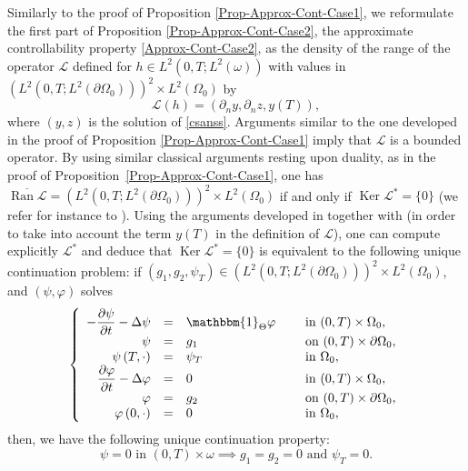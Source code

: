 \documentclass[JEP,XML,SOM,Unicode,NoFloatCountersInSection]{cedram}
\DeclareMathOperator{\Ker}{Ker}
\DeclareMathOperator{\Ran}{Ran}
\theoremstyle{definition}
\begin{document}
Similarly to the proof of Proposition \ref{Prop-Approx-Cont-Case1}, we reformulate the first part of Proposition \ref{Prop-Approx-Cont-Case2}, \ie the approximate controllability property \eqref{Approx-Cont-Case2}, as the density of the range of the operator $\mathcal{L}$ defined for $h \in L^2(0,T; L^2(\omega))$ with values in $(L^2(0,T; L^2(\partial \Omega_0)))^2 \times L^2(\Omega_0)$ by
\[
\mathcal{L} (h) = (\partial_n y, \partial_n z, y(T)),
\]
where $(y,z)$ is the solution of \eqref{csanss}. Arguments similar to the one developed in the proof of Proposition \ref{Prop-Approx-Cont-Case1} imply that $\mathcal L$ is a bounded operator.
By using similar classical arguments resting upon duality, as in the proof of Proposition~\ref{Prop-Approx-Cont-Case1}, one has $\overline{\Ran \mathcal{L}} = (L^2(0,T; L^2(\partial \Omega_0)))^2 \times L^2(\Omega_0)$ if and only if $\Ker \mathcal{L}^* = \{0\}$ (we refer for instance to \cite[Cor.\,2.18]{Brezis}). Using the arguments developed in \cite[Prop.\,2.1]{Lissy-Privat-Simpore} together with \cite[Th.\,2.43, p.\,56]{CNL} (in order to take into account the term $y(T)$ in the definition of $\mathcal L$), one can compute explicitly $\mathcal L^*$ and deduce that $\Ker\mathcal{L}^* = \{0\}$ is equivalent to the following unique continuation problem: if $(g_1, g_2, \psi_T) \in (L^2(0,T; L^2(\partial\Omega_0)))^2\times L^2(\Omega_0)$, and $(\psi, \varphi)$ solves
\begin{equation}
\label{Coupled-Heat-Approx-Adj-Case2}
\left\{
\begin{array}{rcll}
- \dfrac{\partial \psi}{\partial t}-\Delta \psi &=&\mathbbm{1}_{\Theta}\varphi \quad&\text{ in }(0,T) \times \Omega_0,
\\
\psi &=& g_1 &\text{ on }(0,T) \times \partial \Omega_0,
\\
\psi \left(T,\cdot\right) &=& \psi_T &\text{ in }\Omega_0,
\\
\dfrac{\partial \varphi}{\partial t}-\Delta \varphi &=& 0 &\text{ in }(0,T) \times \Omega_0,
\\
\varphi &=& g_2 &\text{ on }(0,T) \times \partial \Omega_0,
\\
\varphi\left(0,\cdot\right) &=&0 &\text{ in }\Omega_0,
\end{array}
\right.
\end{equation}
then, we have the following unique continuation property:
\begin{equation}
\label{UC-Adj-Coupled-Case2}
\psi = 0 \text{ in } (0,T) \times \omega \implies g_1 =g_2 = 0 \text{ and } \psi_T = 0.
\end{equation}
\end{document}
